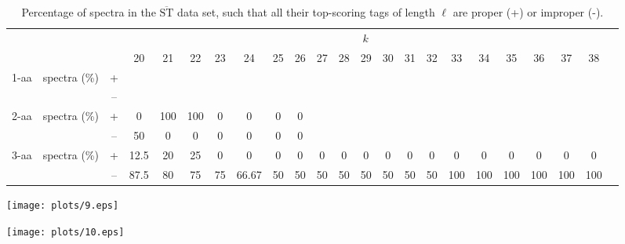 \documentclass{article}
\def\STbar{{\overline{\mathrm{ST}}}}
\begin{document}
\begin{table}[ht]\footnotesize
\vspace{3mm}
{\centering
\begin{center}
\begin{tabular}{|c|cc|c|c|c|c|c|c|c|c|c|c|c|c|c|c|c|c|c|c|c|c|}
  \hline
  \multicolumn{3}{|c|}{ } & \multicolumn{ 19}{|c|}{$k$} \\
  \cline{4-22 }
  \multicolumn{3}{|c|}{ } 
 & 20 & 21 & 22 & 23 & 24 & 25 & 26 & 27 & 28 & 29 & 30 & 31 & 32 & 33 & 34 & 35 & 36 & 37 & 38\\
\hline
  \multirow{2}{*}{1-aa}& \multirow{2}{*}{spectra (\%)}  &  +
 &  &  &  &  &  &  &  &  &  &  &  &  &  &  &  &  &  &  & \\
 & 
 &  --
 &  &  &  &  &  &  &  &  &  &  &  &  &  &  &  &  &  &  & \\
\hline
  \multirow{2}{*}{2-aa}& \multirow{2}{*}{spectra (\%)}  &  +
 & 0 & 100 & 100 & 0 & 0 & 0 & 0 &  &  &  &  &  &  &  &  &  &  &  & \\
 & 
 &  --
 & 50 & 0 & 0 & 0 & 0 & 0 & 0 &  &  &  &  &  &  &  &  &  &  &  & \\
\hline
  \multirow{2}{*}{3-aa}& \multirow{2}{*}{spectra (\%)}  &  +
 & 12.5 & 20 & 25 & 0 & 0 & 0 & 0 & 0 & 0 & 0 & 0 & 0 & 0 & 0 & 0 & 0 & 0 & 0 & 0\\
 & 
 &  --
 & 87.5 & 80 & 75 & 75 & 66.67 & 50 & 50 & 50 & 50 & 50 & 50 & 50 & 50 & 100 & 100 & 100 & 100 & 100 & 100 \\
  \hline
\end{tabular}
\end{center}
\par}
\centering

\caption{Percentage of spectra in the $\STbar$ data set, such that all their top-scoring tags of length $\ell$ are proper (+) or improper (-).}

\vspace{3mm}
\label{table:all-top-scoring}
\end{table}
\texttt{[image: plots/9.eps]}

\texttt{[image: plots/10.eps]}
\end{document}
